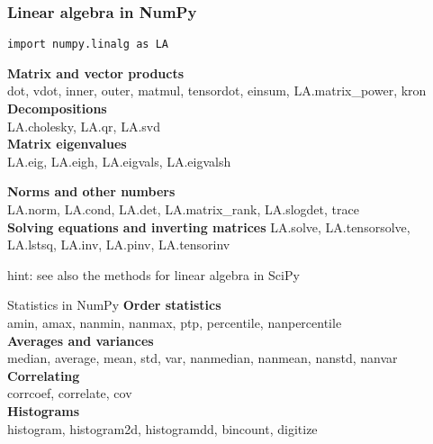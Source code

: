 \begin{frame}[fragile]\frametitle{Linear algebra in NumPy}
 \lstinline{import numpy.linalg as LA}


 \textbf{Matrix and vector products}\\
 {\small dot, vdot, inner, outer, matmul, tensordot, einsum, LA.matrix\_power,
 kron}\\[0.2truecm]
 
 \textbf{Decompositions}\\
 {\small LA.cholesky, LA.qr, LA.svd}\\
 
 \textbf{Matrix eigenvalues}\\
 
 \alert{\small LA.eig, LA.eigh, LA.eigvals, LA.eigvalsh}\qquad

 \textbf{Norms and other numbers}\\
 {\small LA.norm, LA.cond, LA.det, LA.matrix\_rank, LA.slogdet,
 trace}\\[0.2truecm]
 
 \textbf{Solving equations and inverting matrices}
 {\small LA.solve, LA.tensorsolve, LA.lstsq, LA.inv, LA.pinv, LA.tensorinv}

 \vspace{0.6truecm}
 hint: see also the methods for linear algebra in SciPy
\end{frame}

\begin{frame}{Statistics in NumPy}
 \textbf{Order statistics}\\
 \small{amin, amax, nanmin, nanmax, ptp, percentile, nanpercentile}\\[0.2truecm]
 \textbf{Averages and variances}\\
 \small{median, average, mean, std, var, nanmedian, nanmean, nanstd, nanvar}\\[0.2truecm]
 \textbf{Correlating}\\
 \small{corrcoef, correlate, cov}\\[0.2truecm]
 \textbf{Histograms}\\
 \small{histogram, histogram2d, histogramdd, bincount, digitize}
\end{frame}

